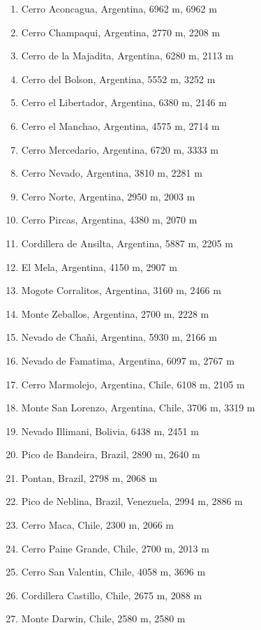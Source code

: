 \documentclass[10pt,twocolumn,letterpaper]{article}
\begin{document}
\begin{flushleft}
\begin{enumerate}
    \item Cerro Aconcagua, Argentina, 6962 m, 6962 m
    \item Cerro Champaqui, Argentina, 2770 m, 2208 m
    \item Cerro de la Majadita, Argentina, 6280 m, 2113 m
    \item Cerro del Bolson, Argentina, 5552 m, 3252 m
    \item Cerro el Libertador, Argentina, 6380 m, 2146 m
    \item Cerro el Manchao, Argentina, 4575 m, 2714 m
    \item Cerro Mercedario, Argentina, 6720 m, 3333 m
    \item Cerro Nevado, Argentina, 3810 m, 2281 m
    \item Cerro Norte, Argentina, 2950 m, 2003 m
    \item Cerro Pircas, Argentina, 4380 m, 2070 m
    \item Cordillera de Ansilta, Argentina, 5887 m, 2205 m
    \item El Mela, Argentina, 4150 m, 2907 m
    \item Mogote Corralitos, Argentina, 3160 m, 2466 m
    \item Monte Zeballos, Argentina, 2700 m, 2228 m
    \item Nevado de Chañi, Argentina, 5930 m, 2166 m
    \item Nevado de Famatima, Argentina, 6097 m, 2767 m
    \item Cerro Marmolejo, Argentina, Chile, 6108 m, 2105 m
    \item Monte San Lorenzo, Argentina, Chile, 3706 m, 3319 m
    \item Nevado Illimani, Bolivia, 6438 m, 2451 m
    \item Pico de Bandeira, Brazil, 2890 m, 2640 m
    \item Pontan, Brazil, 2798 m, 2068 m
    \item Pico de Neblina, Brazil, Venezuela, 2994 m, 2886 m
    \item Cerro Maca, Chile, 2300 m, 2066 m
    \item Cerro Paine Grande, Chile, 2700 m, 2013 m
    \item Cerro San Valentin, Chile, 4058 m, 3696 m
    \item Cordillera Castillo, Chile, 2675 m, 2088 m
    \item Monte Darwin, Chile, 2580 m, 2580 m

\end{enumerate}
\end{flushleft}
\end{document}
